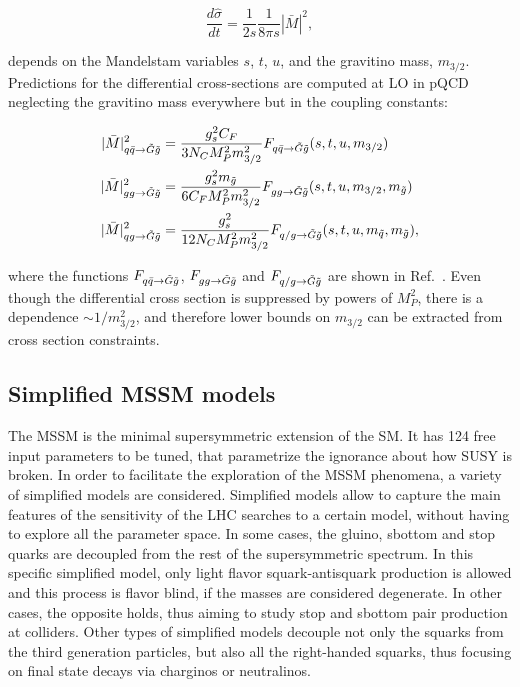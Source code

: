 \begin{equation}
\frac{d\hat{\sigma}}{dt} = \frac{1}{2s}\frac{1}{8\pi s}|\bar{M}|^2,
\label{eq:SUSYGMSBproductionXSectionGeneral}
\end{equation}

\noindent depends on the Mandelstam variables $s$, $t$, $u$, and the gravitino mass, $m_{3/2}$.
Predictions for the differential cross-sections are computed at LO in pQCD neglecting the gravitino mass everywhere but in the coupling constants:

\begin{equation}
\begin{split}
|\bar{M}|^2_{q\bar{q}\rightarrow \tilde{G} \tilde{g}} &= \frac{g_s^2 C_F}{3 N_C M_P^2 m_{3/2}^2} F_{q\bar{q}\rightarrow \tilde{G} \tilde{g}}(s, t, u, m_{3/2}) \\
|\bar{M}|^2_{gg\rightarrow \tilde{G} \tilde{g}} &= \frac{g_s^2 m_{\tilde{g}}}{6 C_F M_P^2 m_{3/2}^2} F_{gg\rightarrow \tilde{G} \tilde{g}}(s, t, u, m_{3/2}, m_{\tilde{g}}) \\
|\bar{M}|^2_{qg\rightarrow \tilde{G} \tilde{g}} &= \frac{g_s^2}{12 N_C M_P^2 m_{3/2}^2} F_{q/g\rightarrow \tilde{G} \tilde{g}}(s, t, u, m_{\tilde{q}}, m_{\tilde{g}}),
\end{split}
\label{eq:SUSYGMSBProductionSpecific}
\end{equation}

\noindent where the functions $F_{q\bar{q}\rightarrow \tilde{G} \tilde{g}}$, $F_{gg\rightarrow \tilde{G} \tilde{g}}$ and $F_{q/g\rightarrow \tilde{G} \tilde{g}}$ are shown in Ref.~\cite{Klasen:2006kb}.
Even though the differential cross section is suppressed by powers of $M_P^2$, there is a dependence $\sim 1/m_{3/2}^2$, and therefore lower bounds on $m_{3/2}$ can be extracted from cross section constraints.


\subsection{Simplified MSSM models}
    \label{subsec:SimplifiedMSSMmodelsTheory}

The MSSM is the minimal supersymmetric extension of the SM. 
It has 124 free input parameters to be tuned, that parametrize the ignorance about how SUSY is broken.
In order to facilitate the exploration of the MSSM phenomena, a variety of simplified models are considered.
Simplified models allow to capture the main features of the sensitivity of the LHC searches to a certain model, without having to explore all the parameter space.
In some cases, the gluino, sbottom and stop quarks are decoupled from the rest of the supersymmetric spectrum.
In this specific simplified model, only light flavor squark-antisquark production is allowed and this process is flavor blind, if the masses are considered degenerate.
In other cases, the opposite holds, thus aiming to study stop and sbottom pair production at colliders.
Other types of simplified models decouple not only the squarks from the third generation particles, but also all the right-handed squarks, thus focusing on final state decays via charginos or neutralinos.

